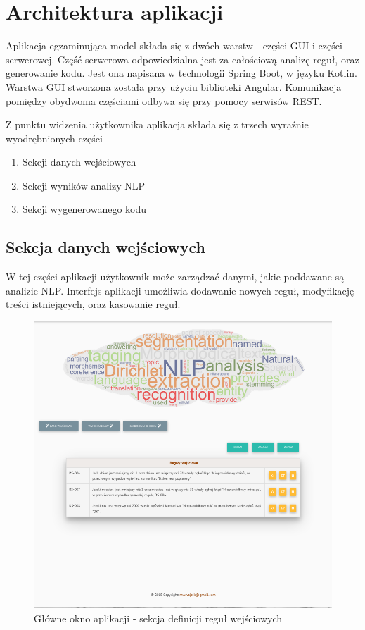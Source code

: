 \section{Architektura aplikacji}

Aplikacja egzaminująca model składa się z dwóch warstw - części GUI i części serwerowej. Część serwerowa odpowiedzialna jest za całościową analizę reguł, oraz generowanie kodu. Jest ona napisana w technologii Spring Boot, w języku Kotlin. Warstwa GUI stworzona została przy użyciu biblioteki Angular. Komunikacja pomiędzy obydwoma częściami odbywa się przy pomocy serwisów REST. 

Z punktu widzenia użytkownika aplikacja składa się z trzech wyraźnie wyodrębnionych części

\begin{enumerate}
	\item Sekcji danych wejściowych
	\item Sekcji wyników analizy NLP
	\item Sekcji wygenerowanego kodu
\end{enumerate}


\subsection{Sekcja danych wejściowych}
W tej części aplikacji użytkownik może zarządzać danymi, jakie poddawane są analizie NLP. Interfejs aplikacji umożliwia dodawanie nowych reguł, modyfikację treści istniejących, oraz kasowanie reguł. 
\begin{figure}[H]
	\centering
	\includegraphics[scale=0.7]{img/app/app-we.png}
	\caption{Główne okno aplikacji - sekcja definicji reguł wejściowych}\label{app-ekran-we}
\end{figure}
